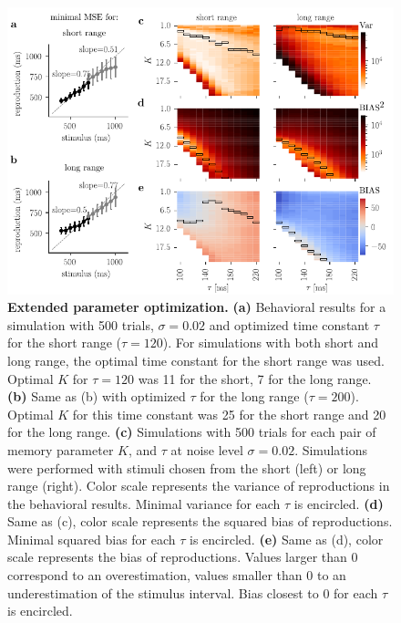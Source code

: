 \documentclass[10pt]{article}
\begin{document}
\begin{figure}[!htb]
	\centering
	\includegraphics{figures/supp_othererror.pdf}
	\caption{\textbf{Extended parameter optimization.}
	\textbf{(a)} Behavioral results for a simulation with 500 trials, $\sigma = 0.02$ and optimized time constant $\tau$ for the short range ($\tau = 120$). For simulations with both short and long range, the optimal time constant for the short range was used. Optimal $K$ for $\tau = 120$ was 11 for the short, 7 for the long range.
	\textbf{(b)} Same as (b) with optimized $\tau$ for the long range ($\tau = 200$). Optimal $K$ for this time constant was 25 for the short range and 20 for the long range. 
	\textbf{(c)}  Simulations with 500 trials for each pair of memory parameter $K$, and $\tau$ at noise level $\sigma = 0.02$. Simulations were performed with stimuli chosen from the short (left) or long range (right). Color scale represents the variance of reproductions in the behavioral results. Minimal variance for each $\tau$ is encircled.
	\textbf{(d)} Same as (c), color scale represents the squared bias of reproductions. Minimal squared bias for each $\tau$ is encircled.
	\textbf{(e)} Same as (d), color scale represents the bias of reproductions. Values larger than 0 correspond to an overestimation, values smaller than 0 to an underestimation of the stimulus interval. Bias closest to 0 for each $\tau$ is encircled.
	}
\label{sup:othererror}
\end{figure}
\end{document}
